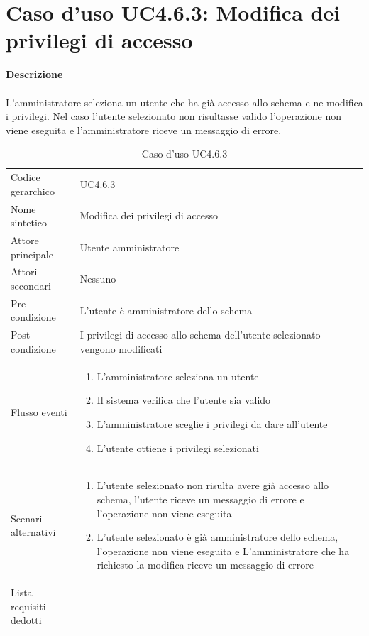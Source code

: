 \documentclass[a4paper]{report}
\begin{document}
	 \section{Caso d'uso UC4.6.3: Modifica dei privilegi di accesso}
	 \textbf{Descrizione} \\ \\
	 L'amministratore seleziona un utente che ha già accesso allo schema e ne modifica i privilegi. 
	 Nel caso l'utente selezionato non risultasse valido l'operazione non viene eseguita e l'amministratore
	  riceve un messaggio di errore.
		\begin{table}[H]
		\begin{tabularx}{\textwidth}{X | X}\toprule
			\rowcolor{orange!65}Codice gerarchico & UC4.6.3 \\
			Nome sintetico & Modifica dei privilegi di accesso \\
			\rowcolor{orange!65}Attore principale & Utente amministratore\\
			Attori secondari & Nessuno \\
			\rowcolor{orange!65}Pre-condizione & L'utente è amministratore dello schema \\
			Post-condizione & I privilegi di accesso allo schema dell'utente selezionato vengono modificati \\
			\rowcolor{orange!65}Flusso eventi & \begin{enumerate}
			\item L'amministratore seleziona un utente
			\item Il sistema verifica che l'utente sia valido
			\item L'amministratore sceglie i privilegi da dare all'utente
			\item L'utente ottiene i privilegi selezionati
			\end{enumerate} \\
			Scenari alternativi & \begin{enumerate}
			\item L'utente selezionato non risulta avere già accesso allo schema, l'utente riceve un messaggio
			 di errore e l'operazione non viene eseguita
			 \item L'utente selezionato è già amministratore dello schema, l'operazione non viene eseguita e
			 L'amministratore che ha richiesto la modifica riceve un messaggio di errore
			\end{enumerate} \\
			\rowcolor{orange!65}Lista requisiti dedotti & \\
			\bottomrule
		\end{tabularx}
		\caption{Caso d'uso UC4.6.3}
	 \end{table}
\end{document}
